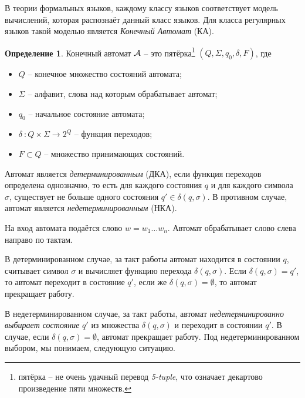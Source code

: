 \documentclass[12pt]{article}
\theoremstyle{definiton}
\theoremstyle{definition}
\theoremstyle{definition}
\newtheorem{Def}{Определение}
\let\es\emptyset
\def\A{{\cal A}}
\begin{document}
В теории формальных языков, каждому классу языков соответствует модель вычислений, которая распознаёт данный класс языков. Для класса регулярных языков такой моделью является \emph{Конечный Автомат} (КА).


	\begin{Def}
		Конечный автомат $\A$ -- это пятёрка\footnote{пятёрка -- не очень удачный перевод \emph{5-tuple}, что означает декартово произведение пяти множеств. } $(Q, \Sigma, q_0, \delta, F)$, где
		\begin{itemize}
			\item $Q$ -- конечное множество состояний автомата;
			\item $\Sigma$ -- алфавит, слова над которым обрабатывает автомат;
			\item $q_0$ -- начальное состояние автомата;
			\item $\delta\ : Q \times \Sigma \to 2^Q $ -- функция переходов;
			\item $F \subset Q$ -- множество принимающих состояний.
		\end{itemize}
	\end{Def}

	Автомат является \emph{детерминированным} (ДКА), если функция переходов определена однозначно, то есть для каждого состояния $q$ и для каждого символа $\sigma$, существует не больше одного состояния $q' \in \delta(q, \sigma)$.  В противном случае, автомат является \emph{недетерминированным} (НКА).

	На вход автомата подаётся слово $w = w_1\ldots w_n$. Автомат обрабатывает слово слева направо по тактам. 


	В детерминированном случае, за такт работы автомат находится в состоянии $q$, считывает символ $\sigma$ и вычисляет функцию перехода $\delta(q, \sigma) $. Если  $\delta(q, \sigma)  = q'$, то автомат переходит в состояние $q'$, если же  $\delta(q, \sigma) = \es $, то автомат прекращает работу.


	В недетерминированном случае, за такт работы, автомат \emph{недетерминированно выбирает состояние} $q'$ из множества  $\delta(q, \sigma) $ и переходит в состоянии $q'$. В случае, если  $\delta(q, \sigma) = \es$, автомат прекращает работу. Под недетерминированном выбором, мы понимаем, следующую ситуацию. %
\end{document}
